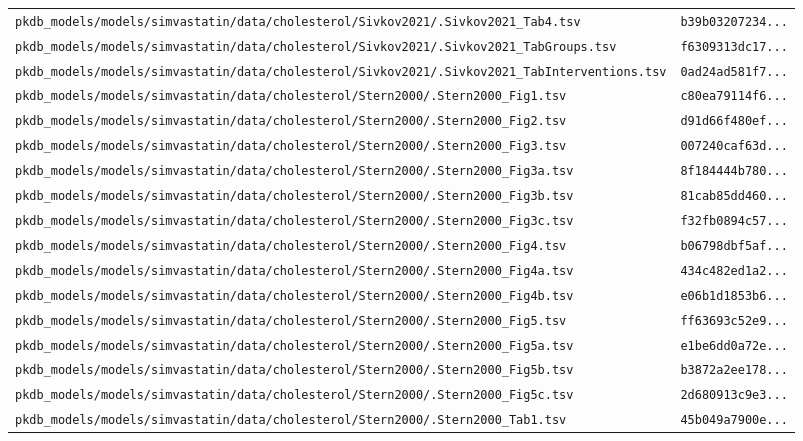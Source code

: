\documentclass{article}
\begin{document}
\begin{longtable}{ll}
\texttt{pkdb\_models/models/simvastatin/data/cholesterol/Sivkov2021/.Sivkov2021\_Tab4.tsv} & \texttt{b39b03207234...} \\
\texttt{pkdb\_models/models/simvastatin/data/cholesterol/Sivkov2021/.Sivkov2021\_TabGroups.tsv} & \texttt{f6309313dc17...} \\
\texttt{pkdb\_models/models/simvastatin/data/cholesterol/Sivkov2021/.Sivkov2021\_TabInterventions.tsv} & \texttt{0ad24ad581f7...} \\
\texttt{pkdb\_models/models/simvastatin/data/cholesterol/Stern2000/.Stern2000\_Fig1.tsv} & \texttt{c80ea79114f6...} \\
\texttt{pkdb\_models/models/simvastatin/data/cholesterol/Stern2000/.Stern2000\_Fig2.tsv} & \texttt{d91d66f480ef...} \\
\texttt{pkdb\_models/models/simvastatin/data/cholesterol/Stern2000/.Stern2000\_Fig3.tsv} & \texttt{007240caf63d...} \\
\texttt{pkdb\_models/models/simvastatin/data/cholesterol/Stern2000/.Stern2000\_Fig3a.tsv} & \texttt{8f184444b780...} \\
\texttt{pkdb\_models/models/simvastatin/data/cholesterol/Stern2000/.Stern2000\_Fig3b.tsv} & \texttt{81cab85dd460...} \\
\texttt{pkdb\_models/models/simvastatin/data/cholesterol/Stern2000/.Stern2000\_Fig3c.tsv} & \texttt{f32fb0894c57...} \\
\texttt{pkdb\_models/models/simvastatin/data/cholesterol/Stern2000/.Stern2000\_Fig4.tsv} & \texttt{b06798dbf5af...} \\
\texttt{pkdb\_models/models/simvastatin/data/cholesterol/Stern2000/.Stern2000\_Fig4a.tsv} & \texttt{434c482ed1a2...} \\
\texttt{pkdb\_models/models/simvastatin/data/cholesterol/Stern2000/.Stern2000\_Fig4b.tsv} & \texttt{e06b1d1853b6...} \\
\texttt{pkdb\_models/models/simvastatin/data/cholesterol/Stern2000/.Stern2000\_Fig5.tsv} & \texttt{ff63693c52e9...} \\
\texttt{pkdb\_models/models/simvastatin/data/cholesterol/Stern2000/.Stern2000\_Fig5a.tsv} & \texttt{e1be6dd0a72e...} \\
\texttt{pkdb\_models/models/simvastatin/data/cholesterol/Stern2000/.Stern2000\_Fig5b.tsv} & \texttt{b3872a2ee178...} \\
\texttt{pkdb\_models/models/simvastatin/data/cholesterol/Stern2000/.Stern2000\_Fig5c.tsv} & \texttt{2d680913c9e3...} \\
\texttt{pkdb\_models/models/simvastatin/data/cholesterol/Stern2000/.Stern2000\_Tab1.tsv} & \texttt{45b049a7900e...} \\

\end{longtable}
\end{document}
